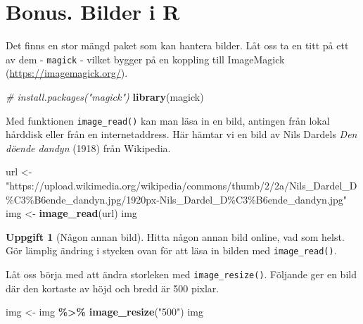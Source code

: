 \documentclass[
]{book}
\newenvironment{Shaded}{\begin{snugshade}}{\end{snugshade}}
\newcommand{\CommentTok}[1]{\textcolor[rgb]{0.56,0.35,0.01}{\textit{#1}}}
\newcommand{\FunctionTok}[1]{\textcolor[rgb]{0.13,0.29,0.53}{\textbf{#1}}}
\newcommand{\NormalTok}[1]{#1}
\newcommand{\OtherTok}[1]{\textcolor[rgb]{0.56,0.35,0.01}{#1}}
\newcommand{\SpecialCharTok}[1]{\textcolor[rgb]{0.81,0.36,0.00}{\textbf{#1}}}
\newcommand{\StringTok}[1]{\textcolor[rgb]{0.31,0.60,0.02}{#1}}
\theoremstyle{definition}
\theoremstyle{definition}
\theoremstyle{definition}
\newtheorem{exercise}{Uppgift}[chapter]
\theoremstyle{definition}
\theoremstyle{remark}
\begin{document}
\hypertarget{bonus.-bilder-i-r}{%
\section{Bonus. Bilder i R}\label{bonus.-bilder-i-r}}

Det finns en stor mängd paket som kan hantera bilder. Låt oss ta en titt på ett av dem - \texttt{magick} - vilket bygger på en koppling till ImageMagick (\url{https://imagemagick.org/}).

\begin{Shaded}
\begin{Highlighting}[]
\CommentTok{\# install.packages("magick")}
\FunctionTok{library}\NormalTok{(magick)}
\end{Highlighting}
\end{Shaded}

Med funktionen \texttt{image\_read()} kan man läsa in en bild, antingen från lokal hårddisk eller från en internetaddress. Här hämtar vi en bild av Nils Dardels \emph{Den döende dandyn} (1918) från Wikipedia.

\begin{Shaded}
\begin{Highlighting}[]
\NormalTok{url }\OtherTok{\textless{}{-}} \StringTok{"https://upload.wikimedia.org/wikipedia/commons/thumb/2/2a/Nils\_Dardel\_D\%C3\%B6ende\_dandyn.jpg/1920px{-}Nils\_Dardel\_D\%C3\%B6ende\_dandyn.jpg"}
\NormalTok{img }\OtherTok{\textless{}{-}} \FunctionTok{image\_read}\NormalTok{(url)}
\NormalTok{img}
\end{Highlighting}
\end{Shaded}

\begin{exercise}[Någon annan bild]
Hitta någon annan bild online, vad som helst. Gör lämplig ändring i stycken ovan för att läsa in bilden med \texttt{image\_read()}.
\end{exercise}

Låt oss börja med att ändra storleken med \texttt{image\_resize()}. Följande ger en bild där den kortaste av höjd och bredd är 500 pixlar.

\begin{Shaded}
\begin{Highlighting}[]
\NormalTok{img }\OtherTok{\textless{}{-}}\NormalTok{ img }\SpecialCharTok{\%\textgreater{}\%} 
  \FunctionTok{image\_resize}\NormalTok{(}\StringTok{"500"}\NormalTok{)}
\NormalTok{img}
\end{Highlighting}
\end{Shaded}
\end{document}
